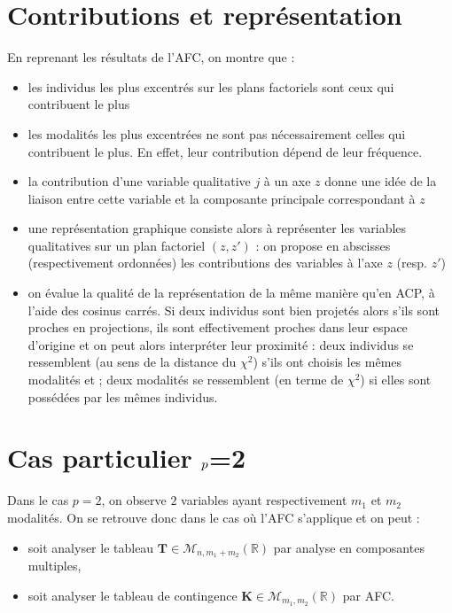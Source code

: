 \documentclass[letterpaper,10pt,french]{sphinxmanual}
\begin{document}
\section{Contributions et représentation}
\label{\detokenize{acm:contributions-et-representation}}
\sphinxAtStartPar
En reprenant les résultats de l’AFC, on montre que :
\begin{itemize}
\item {} 
\sphinxAtStartPar
les individus les plus excentrés sur les plans factoriels sont ceux qui contribuent le plus

\item {} 
\sphinxAtStartPar
les modalités les plus excentrées ne sont pas nécessairement celles qui
contribuent le plus. En effet, leur contribution dépend de leur fréquence.

\item {} 
\sphinxAtStartPar
la contribution d’une variable qualitative \(j\) à un axe \(z\) donne une idée de la liaison entre cette variable et la composante principale correspondant à \(z\)

\item {} 
\sphinxAtStartPar
une représentation graphique consiste alors à représenter les variables qualitatives sur un plan factoriel \((z,z')\) : on propose en abscisses (respectivement ordonnées) les contributions des variables à l’axe \(z\) (resp. \(z'\))

\item {} 
\sphinxAtStartPar
on évalue la qualité de la représentation de la même manière qu’en ACP, à l’aide des cosinus carrés. Si deux individus sont bien projetés alors s’ils sont proches en projections, ils sont effectivement proches dans leur espace d’origine et on peut alors interpréter leur proximité :
deux individus se ressemblent (au sens de la distance du \(\chi^2\)) s’ils ont choisis les mêmes modalités et ; deux modalités se ressemblent (en terme de \(\chi^2\)) si elles sont possédées par les mêmes individus.

\end{itemize}


\section{Cas particulier \protect\(p\protect\)=2}
\label{\detokenize{acm:cas-particulier-p-2}}
\sphinxAtStartPar
Dans le cas \(p=2\), on observe \(2\) variables ayant respectivement \(m_1\) et \(m_2\) modalités. On se retrouve donc dans le cas où l’AFC s’applique et on peut :
\begin{itemize}
\item {} 
\sphinxAtStartPar
soit analyser le tableau \(\mathbf{T}\in\mathcal{M}_{n,m_1+m_2}(\mathbb{R})\) par analyse en composantes multiples,

\item {} 
\sphinxAtStartPar
soit analyser le tableau de contingence \(\mathbf{K}\in\mathcal{M}_{m_1,m_2}(\mathbb{R})\) par AFC.

\end{itemize}
\end{document}
